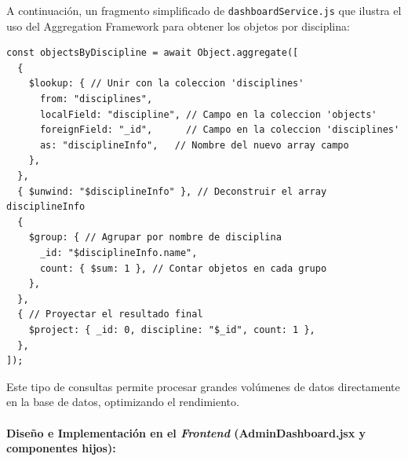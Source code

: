 A continuación, un fragmento simplificado de \texttt{dashboardService.js} que ilustra el uso del Aggregation Framework para obtener los objetos por disciplina:

\begin{center}
\begin{minipage}{\linewidth}
\begin{lstlisting}[style=miJavaScript, caption=Ejemplo de agregación en \texttt{dashboardService.js} para \texttt{objectsByDiscipline}, label=lts:dashboardServiceAggregation]
const objectsByDiscipline = await Object.aggregate([
  {
    $lookup: { // Unir con la coleccion 'disciplines'
      from: "disciplines",
      localField: "discipline", // Campo en la coleccion 'objects'
      foreignField: "_id",      // Campo en la coleccion 'disciplines'
      as: "disciplineInfo",   // Nombre del nuevo array campo
    },
  },
  { $unwind: "$disciplineInfo" }, // Deconstruir el array disciplineInfo
  {
    $group: { // Agrupar por nombre de disciplina
      _id: "$disciplineInfo.name",
      count: { $sum: 1 }, // Contar objetos en cada grupo
    },
  },
  { // Proyectar el resultado final
    $project: { _id: 0, discipline: "$_id", count: 1 },
  },
]);
\end{lstlisting}
\end{minipage}
\end{center}
Este tipo de consultas permite procesar grandes volúmenes de datos directamente en la base de datos, optimizando el rendimiento.


\paragraph{Diseño e Implementación en el \textit{Frontend} (\textbf{AdminDashboard.jsx} y componentes hijos):}

